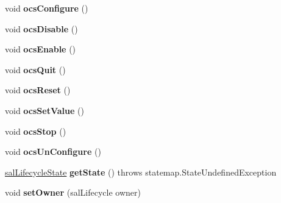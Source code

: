 \begin{DoxyCompactItemize}
\item 
\hypertarget{classsal_lifecycle_context_a3f8c0a280d38bbb4a1a5d8d22490844e}{void {\bfseries ocs\-Configure} ()}\label{classsal_lifecycle_context_a3f8c0a280d38bbb4a1a5d8d22490844e}

\item 
\hypertarget{classsal_lifecycle_context_aa091643e8f189b1cbf7584a9944e6e64}{void {\bfseries ocs\-Disable} ()}\label{classsal_lifecycle_context_aa091643e8f189b1cbf7584a9944e6e64}

\item 
\hypertarget{classsal_lifecycle_context_a3cbbd9a3b6613764d6f341a8c72b5aa8}{void {\bfseries ocs\-Enable} ()}\label{classsal_lifecycle_context_a3cbbd9a3b6613764d6f341a8c72b5aa8}

\item 
\hypertarget{classsal_lifecycle_context_ae9fbaf60dee7565329aae5db085b069b}{void {\bfseries ocs\-Quit} ()}\label{classsal_lifecycle_context_ae9fbaf60dee7565329aae5db085b069b}

\item 
\hypertarget{classsal_lifecycle_context_a368e8a292ad623f67187219a3dc2eca1}{void {\bfseries ocs\-Reset} ()}\label{classsal_lifecycle_context_a368e8a292ad623f67187219a3dc2eca1}

\item 
\hypertarget{classsal_lifecycle_context_a10ca8dcf34e175612db7f3cce421343d}{void {\bfseries ocs\-Set\-Value} ()}\label{classsal_lifecycle_context_a10ca8dcf34e175612db7f3cce421343d}

\item 
\hypertarget{classsal_lifecycle_context_a84c110a3e22e2f9b649fbbf479007b0b}{void {\bfseries ocs\-Stop} ()}\label{classsal_lifecycle_context_a84c110a3e22e2f9b649fbbf479007b0b}

\item 
\hypertarget{classsal_lifecycle_context_a4f5c224ef8b4b16e4824c47ce2bb89de}{void {\bfseries ocs\-Un\-Configure} ()}\label{classsal_lifecycle_context_a4f5c224ef8b4b16e4824c47ce2bb89de}

\item 
\hypertarget{classsal_lifecycle_context_aaff1ef965fa37e8afbe77ddabef6350c}{\hyperlink{classsal_lifecycle_state}{sal\-Lifecycle\-State} {\bfseries get\-State} ()  throws statemap.\-State\-Undefined\-Exception     }\label{classsal_lifecycle_context_aaff1ef965fa37e8afbe77ddabef6350c}

\item 
\hypertarget{classsal_lifecycle_context_a465b41ff56477227b1beecdebaa3d655}{void {\bfseries set\-Owner} (sal\-Lifecycle owner)}\label{classsal_lifecycle_context_a465b41ff56477227b1beecdebaa3d655}

\end{DoxyCompactItemize}
